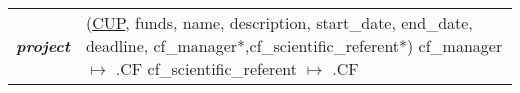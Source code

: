 \begin{tabular}{@{}l l@{}}
	\textbf{\textit{project}}           & \makecell[lt]{
	(\underline{CUP}, funds, name, description, start\_date, end\_date,                                                                               \\
	\qquad deadline, cf\_manager*,cf\_scientific\_referent*)  \smallskip                                                                              \\
	cf\_manager $\mapsto$ \baseemp.CF                                                                                                                 \\
		cf\_scientific\_referent $\mapsto$ \baseemp.CF}\medskip
\end{tabular}


